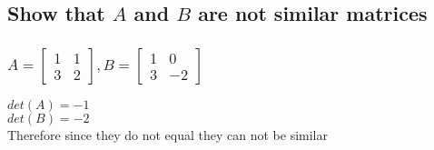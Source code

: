 \documentclass[12pt, a4paper]{article}
\begin{document}
		\subsection{Show that $A$ and $B$ are not similar matrices}
			\subsubsection{$A=\begin{bmatrix}1&1\\3&2\end{bmatrix}, B=\begin{bmatrix}1 & 0 \\ 3 & -2\end{bmatrix}$}
				$det(A)=-1$\\
				$det(B)=-2$\\
				Therefore since they do not equal they can not be similar
\end{document}
